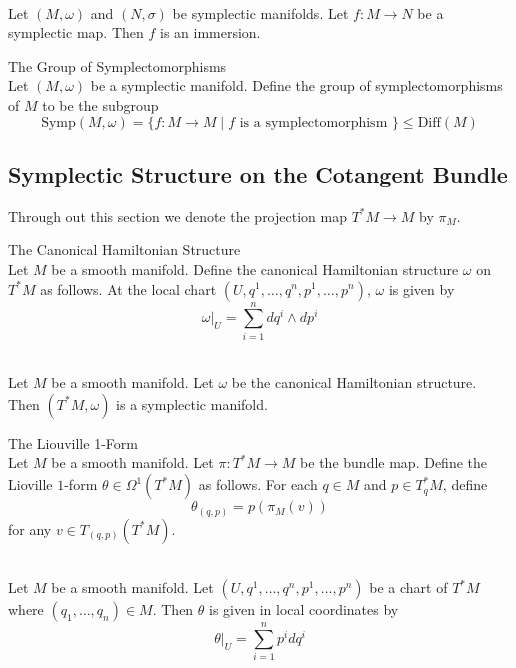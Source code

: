 \documentclass[a4paper]{article}
\begin{document}
\begin{lmm}{}{}\\
Let $(M,\omega)$ and $(N,\sigma)$ be symplectic manifolds. Let $f:M\to N$ be a symplectic map. Then $f$ is an immersion. 
\end{lmm}

\begin{defn}{The Group of Symplectomorphisms}{}\\
Let $(M,\omega)$ be a symplectic manifold. Define the group of symplectomorphisms of $M$ to be the subgroup $$\text{Symp}(M,\omega)=\{f:M\to M\;|\;f\text{ is a symplectomorphism }\}\leq\text{Diff}(M)$$
\end{defn}

\subsection{Symplectic Structure on the Cotangent Bundle}
Through out this section we denote the projection map $T^\ast M\to M$ by $\pi_M$. 

\begin{defn}{The Canonical Hamiltonian Structure}{}\\
Let $M$ be a smooth manifold. Define the canonical Hamiltonian structure $\omega$ on $T^\ast M$ as follows. At the local chart $(U,q^1,\dots,q^n,p^1,\dots,p^n)$, $\omega$ is given by $$\omega|_U=\sum_{i=1}^ndq^i\wedge dp^i$$
\end{defn}

\begin{lmm}{}{}\\
Let $M$ be a smooth manifold. Let $\omega$ be the canonical Hamiltonian structure. Then $(T^\ast M,\omega)$ is a symplectic manifold. 
\end{lmm}

\begin{defn}{The Liouville 1-Form}{}\\
Let $M$ be a smooth manifold. Let $\pi:T^\ast M\to M$ be the bundle map. Define the Lioville $1$-form $\theta\in\Omega^1(T^\ast M)$ as follows. For each $q\in M$ and $p\in T_q^\ast M$, define $$\theta_{(q,p)}=p(\pi_M(v))$$ for any $v\in T_{(q,p)}(T^\ast M)$. 
\end{defn}

\begin{prp}{}{}\\
Let $M$ be a smooth manifold. Let $(U,q^1,\dots,q^n,p^1,\dots,p^n)$ be a chart of $T^\ast M$ where $(q_1,\dots,q_n)\in M$. Then $\theta$ is given in local coordinates by $$\theta|_U=\sum_{i=1}^np^idq^i$$
\end{prp}
\end{document}
